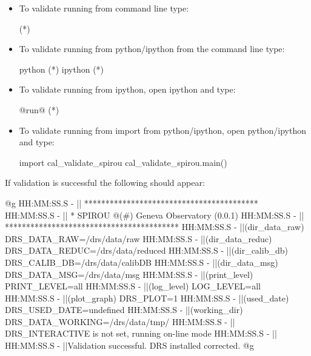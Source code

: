 \begin{itemize}

\item To validate running from command line type:
\begin{cmdbox}
(*\calvalidate*)
\end{cmdbox}

\item To validate running from python/ipython from the command line type:
\begin{cmdbox}
python (*\calvalidate*)
ipython (*\calvalidate*)
\end{cmdbox}

\item To validate running from ipython, open ipython and type:
\begin{pythonbox}
@run@ (*\calvalidate*)
\end{pythonbox}

\item To validate running from import from python/ipython, open python/ipython and type:
\begin{pythonbox}
import cal_validate_spirou
cal_validate_spirou.main()
\end{pythonbox}

\end{itemize}

\noindent If validation is successful the following should appear:

\begin{cmdboxprintspecial}
@g
HH:MM:SS.S -   || *****************************************
HH:MM:SS.S -   || * SPIROU @(#) Geneva Observatory (0.0.1)
HH:MM:SS.S -   || *****************************************
HH:MM:SS.S -   ||(dir_data_raw)      DRS_DATA_RAW=/drs/data/raw
HH:MM:SS.S -   ||(dir_data_reduc)    DRS_DATA_REDUC=/drs/data/reduced
HH:MM:SS.S -   ||(dir_calib_db)      DRS_CALIB_DB=/drs/data/calibDB
HH:MM:SS.S -   ||(dir_data_msg)      DRS_DATA_MSG=/drs/data/msg
HH:MM:SS.S -   ||(print_level)       PRINT_LEVEL=all         %
HH:MM:SS.S -   ||(log_level)         LOG_LEVEL=all         %
HH:MM:SS.S -   ||(plot_graph)        DRS_PLOT=1            %
HH:MM:SS.S -   ||(used_date)         DRS_USED_DATE=undefined
HH:MM:SS.S -   ||(working_dir)       DRS_DATA_WORKING=/drs/data/tmp/
HH:MM:SS.S -   ||                    DRS_INTERACTIVE is not set, running on-line mode
HH:MM:SS.S -   ||
HH:MM:SS.S -   ||Validation successful. DRS installed corrected.
@g
\end{cmdboxprintspecial}





